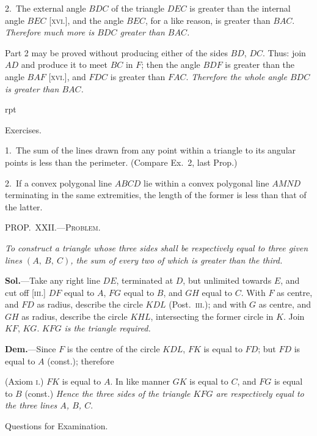 \documentclass[oneside]{book}
\newcounter{wrapwidth}
\newcommand\mypropl[2]{
\bigskip\Needspace*{4\baselineskip}\begin{center}\textsc{#1}\end{center}
\hspace{\parindent}\emph{#2}\par\medskip
}
\newcommand\exhead[1]{
\Needspace*{5\baselineskip}\begin{center}
\textsf{#1}
\end{center}
}
\newcommand\exheadin[1]{
\par\medskip\Needspace*{4\baselineskip}
\hspace{1.5\parindent}\textsf{#1}\par\medskip
}
\newcommand\imgflow[3]{
\setcounter{wrapwidth}{#1}

\begin{wrapfigure}[#2]{r}{\value{wrapwidth}pt}
\begin{center}
\vspace{-0.3in}

\end{center}
\end{wrapfigure}
}
\newcommand\imgcent[2]{
\begin{center}

\end{center}
}
\begin{document}
2.~The external angle $BDC$ of the triangle $DEC$ is
greater than the internal angle $BEC$ [\textsc{xvi}.], and the angle
$BEC$, for a like reason, is greater than $BAC$. \emph{Therefore
much more is $BDC$ greater than $BAC$.}

Part 2 may be proved without producing either of
the sides $BD$, $DC$. Thus: join $AD$ and produce it to
meet $BC$ in $F$; then the angle $BDF$ is greater than
the angle $BAF$ [\textsc{xvi}.], and $FDC$ is greater than $FAC$.
\emph{Therefore the whole angle $BDC$ is greater than $BAC$.}


\imgflow{138}{8}{f038}

\exheadin{Exercises.}

\begin{footnotesize}
1.~The sum of the lines drawn from any point within a triangle
to its angular points is less than
the perimeter. (Compare Ex.~2,
last Prop.)

2.~If a convex polygonal line
$ABCD$ lie within a convex polygonal
line $AMND$ terminating in
the same extremities, the length of
the former is less than that of the
latter.

\par\end{footnotesize}


\mypropl{PROP\@.~XXII\@.---Problem.}{To construct a triangle whose three sides shall be respectively
equal to three given lines $(A,\ B,\ C)$, the sum of every
two of which is greater than the third.}

\textbf{Sol.}---Take any right line $DE$, terminated at $D$, but
unlimited towards $E$, and cut off [\textsc{iii}.] $DF$ equal to $A$,
$FG$ equal to $B$, and $GH$ equal to $C$. With $F$ as centre,
and $FD$ as radius, describe the circle $KDL$ (Post.~\textsc{iii}.);
and with $G$ as centre, and $GH$ as radius, describe the
circle $KHL$, intersecting the former circle in $K$. Join
$KF$, $KG$. $KFG$ \emph{is the triangle required.}


\imgcent{290}{f039}

\textbf{Dem.}---Since $F$ is the centre of the circle $KDL$, $FK$
is equal to $FD$; but $FD$ is equal to $A$ (const.); therefore

(Axiom \textsc{i}.) $FK$ is equal to $A$. In like manner $GK$
is equal to $C$, and $FG$ is equal to $B$ (const.) \textit{Hence
the three sides of the triangle $KFG$ are respectively equal
to the three lines $A$, $B$, $C$}.

\exhead{Questions for Examination.}
\end{document}
